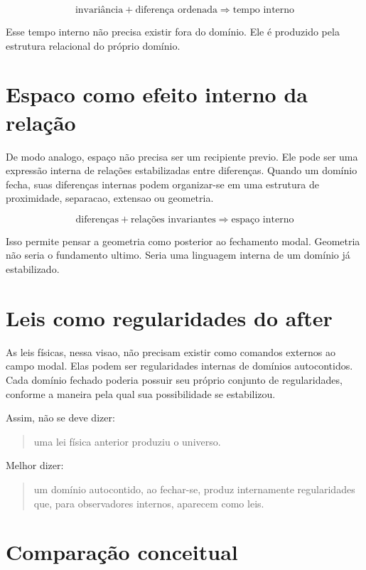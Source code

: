 \documentclass[11pt,a4paper]{article}
\newcommand{\depends}{\Rightarrow}
\begin{document}
\[
\text{invariância} + \text{diferença ordenada} \depends \text{tempo interno}
\]

Esse tempo interno não precisa existir fora do domínio. Ele é produzido pela estrutura relacional do próprio domínio.

\section{Espaco como efeito interno da relação}

De modo analogo, espaço não precisa ser um recipiente previo. Ele pode ser uma expressão interna de relações estabilizadas entre diferenças. Quando um domínio fecha, suas diferenças internas podem organizar-se em uma estrutura de proximidade, separacao, extensao ou geometria.

\[
\text{diferenças} + \text{relações invariantes} \depends \text{espaço interno}
\]

Isso permite pensar a geometria como posterior ao fechamento modal. Geometria não seria o fundamento ultimo. Seria uma linguagem interna de um domínio já estabilizado.

\section{Leis como regularidades do after}

As leis físicas, nessa visao, não precisam existir como comandos externos ao campo modal. Elas podem ser regularidades internas de domínios autocontidos. Cada domínio fechado poderia possuir seu próprio conjunto de regularidades, conforme a maneira pela qual sua possibilidade se estabilizou.

Assim, não se deve dizer:

\begin{quote}
uma lei física anterior produziu o universo.
\end{quote}

Melhor dizer:

\begin{quote}
um domínio autocontido, ao fechar-se, produz internamente regularidades que, para observadores internos, aparecem como leis.
\end{quote}

\section{Comparação conceitual}
\end{document}
